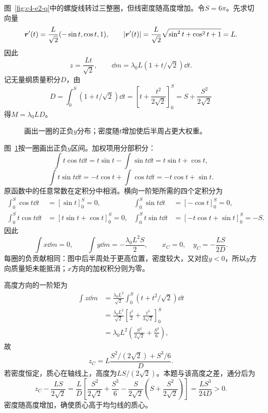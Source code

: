 \begin{solution}
图~\ref{fig:c4-e2-q}中的螺旋线转过三整圈，但线密度随高度增加。令$S=6\pi$。先求切向量
\[\bm{r}'(t)=\frac L{\sqrt2}(-\sin t,\cos t,1),\qquad
|\bm{r}'(t)|=\frac L{\sqrt2}\sqrt{\sin^2t+\cos^2t+1}=L.\]
因此
\[
 z=\frac{Lt}{\sqrt2},\qquad
 \dd m=\lambda_0L(1+t/\sqrt2)\dd t.
\]
记无量纲质量积分$D$，由
\[
 D=\int_0^S(1+t/\sqrt2)\dd t
 =\left[t+\frac{t^2}{2\sqrt2}\right]_0^S
 =S+\frac{S^2}{2\sqrt2}
\]
得$\boxed{M=\lambda_0LD}$。
\begin{figure}[H]\centering
{}
\caption{画出一圈的正负$y$分布；密度随$t$增加使后半周占更大权重。}\label{fig:c4-e2-s}
\end{figure}
图~\ref{fig:c4-e2-s}按一圈画出正负$y$区间。加权项用分部积分：
\[\int t\cos t\dd t=t\sin t-\int\sin t\dd t=t\sin t+\cos t,\]
\[\int t\sin t\dd t=-t\cos t+\int\cos t\dd t=-t\cos t+\sin t.\]
原函数中的任意常数在定积分中相消。横向一阶矩所需的四个定积分为
\[
 \begin{aligned}
 \int_0^S\cos t\dd t&=[\sin t]_0^S=0,&
 \int_0^S\sin t\dd t&=[-\cos t]_0^S=0,\\
 \int_0^St\cos t\dd t&=[t\sin t+\cos t]_0^S=0,&
 \int_0^St\sin t\dd t&=[-t\cos t+\sin t]_0^S=-S.
 \end{aligned}
\]
因此
\[
 \int x\dd m=0,\qquad
 \int y\dd m=-\frac{\lambda_0L^2S}{2},
 \qquad
 \boxed{x_C=0,\quad y_C=-\frac{LS}{2D}}.
\]
每圈的负贡献相同：图中后半周处于更高位置，密度较大，又对应$y<0$，所以$y$方向质量矩未能抵消；$x$方向的加权积分则为零。

高度方向的一阶矩为
\[
 \begin{aligned}
 \int z\dd m
 &=\frac{\lambda_0L^2}{\sqrt2}
 \int_0^S(t+t^2/\sqrt2)\dd t\\
 &=\frac{\lambda_0L^2}{\sqrt2}
 \left[\frac{t^2}{2}+\frac{t^3}{3\sqrt2}\right]_0^S\\
 &=\lambda_0L^2\left(\frac{S^2}{2\sqrt2}+\frac{S^3}{6}\right),
 \end{aligned}
\]
故
\[
 \boxed{z_C=L\frac{S^2/(2\sqrt2)+S^3/6}{D}}.
\]
若密度恒定，质心在轴线上，高度为$LS/(2\sqrt2)$。本题与该高度之差，通分后为
\[
 z_C-\frac{LS}{2\sqrt2}
 =\frac LD\left[\frac{S^2}{2\sqrt2}+\frac{S^3}{6}
 -\frac S{2\sqrt2}\left(S+\frac{S^2}{2\sqrt2}\right)\right]
 =\frac{LS^3}{24D}>0.
\]
密度随高度增加，确使质心高于均匀线的质心。
\end{solution}

